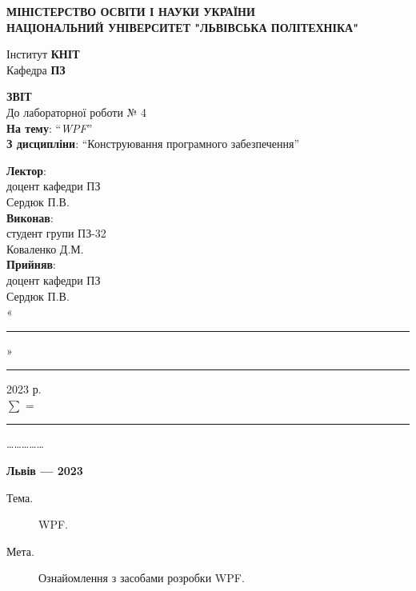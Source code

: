 \documentclass[14pt]{extreport}
\newcommand\subject{Конструювання програмного забезпечення}
\newcommand\lecturer{доцент кафедри ПЗ\\Сердюк П.В.}
\newcommand\teacher{доцент кафедри ПЗ\\Сердюк П.В.}
\newcommand\mygroup{ПЗ-32}
\newcommand\lab{4}
\newcommand\theme{WPF}
\newcommand\purpose{Ознайомлення з засобами розробки WPF}
\begin{document}
\begin{normalsize}
	\begin{titlepage}
		\thispagestyle{empty}
		\begin{center}
			\textbf{МІНІСТЕРСТВО ОСВІТИ І НАУКИ УКРАЇНИ\\
				НАЦІОНАЛЬНИЙ УНІВЕРСИТЕТ "ЛЬВІВСЬКА ПОЛІТЕХНІКА"}
		\end{center}
		\begin{flushright}
			Інститут \textbf{КНІТ}\\
			Кафедра \textbf{ПЗ}
		\end{flushright}
		\vspace{200pt}
		\begin{center}
			\textbf{ЗВІТ}\\
			\vspace{10pt}
			До лабораторної роботи № \lab\\
			\textbf{На тему}: “\textit{\theme}”\\
			\textbf{З дисципліни}: “\subject”
		\end{center}
		\vspace{40pt}
		\begin{flushright}
			
			\textbf{Лектор}:\\
			\lecturer\\
			\vspace{10pt}
			\textbf{Виконав}:\\
			
			студент групи \mygroup\\
			Коваленко Д.М.\\
			\vspace{10pt}
			\textbf{Прийняв}:\\
			
			\teacher\\
			
			\vspace{28pt}
			«\rule{1cm}{0.15mm}» \rule{1.5cm}{0.15mm} 2023 р.\\
			$\sum$ = \rule{1cm}{0.15mm}……………\\
			
		\end{flushright}
		\vspace{\fill}
		\begin{center}
			\textbf{Львів — 2023}
		\end{center}
	\end{titlepage}
		
	\begin{description}
		\item[Тема.] \theme.
		\item[Мета.] \purpose.
	\end{description}


\end{normalsize}
\end{document}

